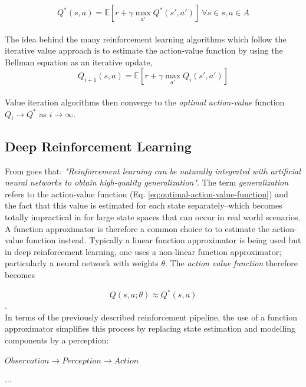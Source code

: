\begin{equation}\label{eq:bellman}
Q^*(s,a)=\mathbb{E}[r+\gamma \max_{a'} Q^*(s',a')] \ \forall{s}\in{s},  a\in{A}
\end{equation}
\\
The idea behind the many reinforcement learning algorithms which follow the iterative value approach is to estimate the action-value function by using the Bellman equation as an iterative update,
\begin{equation}
Q_{i+1}(s,a)=\mathbb{E}[r+\gamma \max_{a'}Q_{i}(s',a')]
\end{equation}
\\
Value iteration algorithms then converge to the \textit{optimal action-value} function $Q_{i} \rightarrow Q^*$ as $i \rightarrow \infty$. \cite{sutton1998reinforcement}

\subsection{Deep Reinforcement Learning}

From \cite{deeprlcourse} goes that: \textit{"Reinforcement learning can be naturally integrated with artificial neural networks to obtain high-quality generalization"}.
The term \textit{generalization} refers to the action-value function (Eq. \ref{eq:optimal-action-value-function}) and the fact that this value is estimated for each state separately--which becomes totally impractical in for large state spaces that can occur in real world scenarios.
A function approximator is therefore a common choice to to estimate the action-value function instead. Typically a linear function approximator is being used but in deep reinforcement learning, one uses a non-linear function approximator; particularly a neural network with weights $\theta$. The \textit{action value function} therefore becomes

\begin{equation}
Q(s, a; \theta) \approx Q^*(s,a)
\end{equation}.
\\
In terms of the previously described reinforcement pipeline, the use of a function approximator simplifies this process by replacing state estimation and modelling components by a perception:
\\
\\
$Observation \rightarrow Perception \rightarrow Action$

...